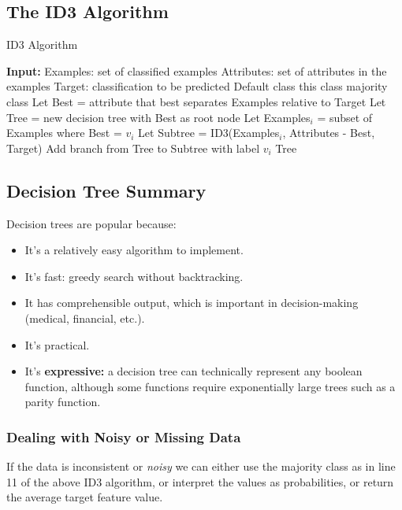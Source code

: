 \documentclass[a4paper,11pt]{article}
\begin{document}
\subsection{The ID3 Algorithm}
\begin{algorithm}[H]
\caption{ID3 Algorithm}
\begin{algorithmic}[1]
    \State \textbf{Input:} 
    \State \quad Examples: set of classified examples
    \State \quad Attributes: set of attributes in the examples
    \State \quad Target: classification to be predicted
        \State \Return Default class
        \State \Return this class
        \State \Return majority class
    \Else
        \State Let Best = attribute that best separates Examples relative to Target
        \State Let Tree = new decision tree with Best as root node
            \State Let Examples$_i$ = subset of Examples where Best = $v_i$
            \State Let Subtree = ID3(Examples$_i$, Attributes - Best, Target)
            \State Add branch from Tree to Subtree with label $v_i$
        \EndFor
        \State \Return Tree
    \EndIf
\EndProcedure
\end{algorithmic}
\end{algorithm}

\subsection{Decision Tree Summary}
Decision trees are popular because:
\begin{itemize}
    \item   It's a relatively easy algorithm to implement.
    \item   It's fast: greedy search without backtracking.
    \item   It has comprehensible output, which is important in decision-making (medical, financial, etc.).
    \item   It's practical.
    \item   It's \textbf{expressive:} a decision tree can technically represent any boolean function, although some functions require exponentially large trees such as a parity function.
\end{itemize}

\subsubsection{Dealing with Noisy or Missing Data}
If the data is inconsistent or \textit{noisy} we can either use the majority class as in line 11 of the above ID3 algorithm, or interpret the values as probabilities, or return the average target feature value.
\end{document}

